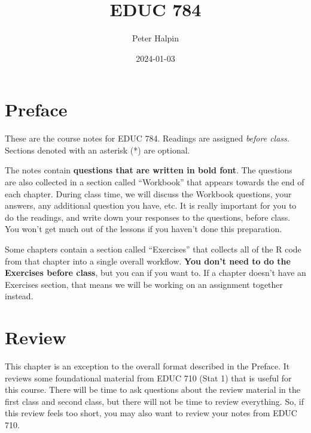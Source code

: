 \documentclass[
  letterpaper,
  DIV=11,
  numbers=noendperiod]{scrreprt}
\title{EDUC 784}
\author{Peter Halpin}
\date{2024-01-03}
\renewcommand*\contentsname{Table of contents}
\newcommand\contentsname{Table of contents}
\begin{document}
\maketitle
\ifdefined\Shaded\renewenvironment{Shaded}{\begin{tcolorbox}[frame hidden, borderline west={3pt}{0pt}{shadecolor}, boxrule=0pt, enhanced, breakable, interior hidden, sharp corners]}{\end{tcolorbox}}\fi

\renewcommand*\contentsname{Table of contents}
{
\hypersetup{linkcolor=}
\setcounter{tocdepth}{2}
\tableofcontents
}

\hypertarget{preface}{%
\chapter*{Preface}\label{preface}}


These are the course notes for EDUC 784. Readings are assigned
\emph{before class.} Sections denoted with an asterisk (*) are optional.

The notes contain \textbf{questions that are written in bold font}. The
questions are also collected in a section called ``Workbook'' that
appears towards the end of each chapter. During class time, we will
discuss the Workbook questions, your answers, any additional question
you have, etc. It is really important for you to do the readings, and
write down your responses to the questions, before class. You won't get
much out of the lessons if you haven't done this preparation.

Some chapters contain a section called ``Exercises'' that collects all
of the R code from that chapter into a single overall workflow.
\textbf{You don't need to do the Exercises before class}, but you can if
you want to. If a chapter doesn't have an Exercises section, that means
we will be working on an assignment together instead.


\hypertarget{sec-chap-1}{%
\chapter{Review}\label{sec-chap-1}}

This chapter is an exception to the overall format described in the
Preface. It reviews some foundational material from EDUC 710 (Stat 1)
that is useful for this course. There will be time to ask questions
about the review material in the first class and second class, but there
will not be time to review everything. So, if this review feels too
short, you may also want to review your notes from EDUC 710.
\end{document}
